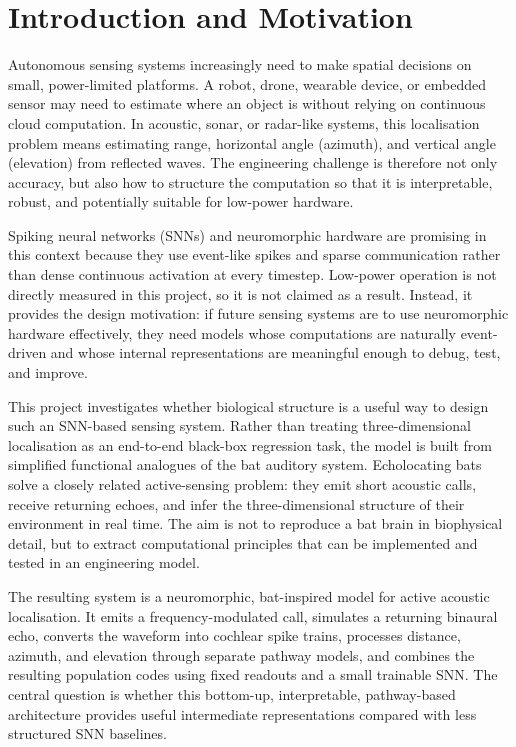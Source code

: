 \chapter{Introduction and Motivation}

Autonomous sensing systems increasingly need to make spatial decisions on small, power-limited platforms. A robot, drone, wearable device, or embedded sensor may need to estimate where an object is without relying on continuous cloud computation. In acoustic, sonar, or radar-like systems, this localisation problem means estimating range, horizontal angle (azimuth), and vertical angle (elevation) from reflected waves. The engineering challenge is therefore not only accuracy, but also how to structure the computation so that it is interpretable, robust, and potentially suitable for low-power hardware.

Spiking neural networks (SNNs) and neuromorphic hardware are promising in this context because they use event-like spikes and sparse communication rather than dense continuous activation at every timestep. Low-power operation is not directly measured in this project, so it is not claimed as a result. Instead, it provides the design motivation: if future sensing systems are to use neuromorphic hardware effectively, they need models whose computations are naturally event-driven and whose internal representations are meaningful enough to debug, test, and improve.

This project investigates whether biological structure is a useful way to design such an SNN-based sensing system. Rather than treating three-dimensional localisation as an end-to-end black-box regression task, the model is built from simplified functional analogues of the bat auditory system. Echolocating bats solve a closely related active-sensing problem: they emit short acoustic calls, receive returning echoes, and infer the three-dimensional structure of their environment in real time. The aim is not to reproduce a bat brain in biophysical detail, but to extract computational principles that can be implemented and tested in an engineering model.

The resulting system is a neuromorphic, bat-inspired model for active acoustic localisation. It emits a frequency-modulated call, simulates a returning binaural echo, converts the waveform into cochlear spike trains, processes distance, azimuth, and elevation through separate pathway models, and combines the resulting population codes using fixed readouts and a small trainable SNN. The central question is whether this bottom-up, interpretable, pathway-based architecture provides useful intermediate representations compared with less structured SNN baselines.

